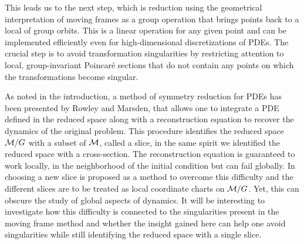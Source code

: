 This leads us to the next step, which is reduction using the
geometrical interpretation of moving frames as a group
operation that brings points back to a local {\csection} of
group orbits. This is a linear operation for any given point
and can be implemented efficiently even for high-dimensional
discretizations of PDEs. The crucial step is to avoid
transformation singularities by restricting attention to
local, group-invariant Poincar\'e sections that do not
contain any points on which the transformations become
singular.

As noted in the introduction, a method of symmetry reduction
for PDEs has been presented by Rowley and
Marsden, that allows one to
integrate a PDE defined in the reduced space along with a
reconstruction equation to recover the dynamics of the
original problem. This procedure identifies the reduced space
$\mathcal{M}/G$ with a subset of $\mathcal{M}$, called a slice, in
the same spirit we identified the reduced space with a
cross-section.
The reconstruction equation is guaranteed to
work locally, in the neighborhood of the initial condition
but can fail globally. In 
choosing a new slice is proposed as a method to overcome this
difficulty and the different slices are to be treated as
local coordinate charts on $\mathcal{M}/G$. Yet, this can
obscure the study of global aspects of dynamics. It will be
interesting to investigate how this difficulty is connected
to the singularities present in the moving frame method and
whether the insight gained here can help one avoid
singularities while still identifying the reduced space with
a single slice.


